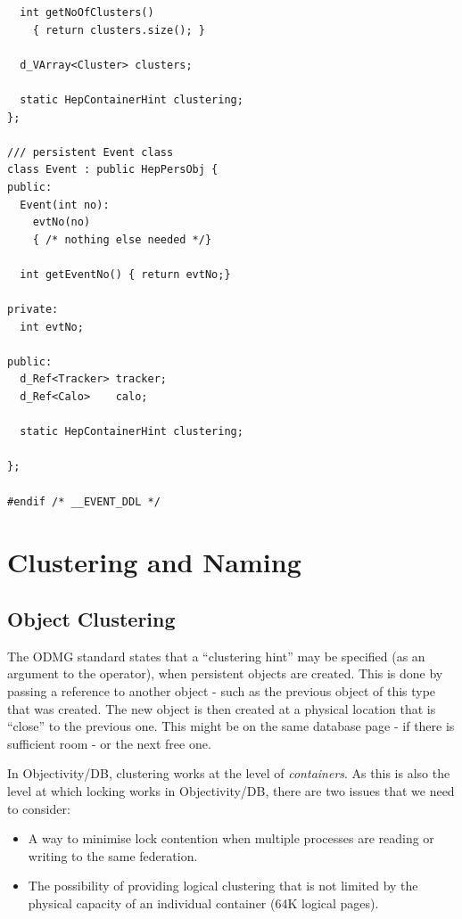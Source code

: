\begin{verbatim}
  int getNoOfClusters() 
    { return clusters.size(); } 

  d_VArray<Cluster> clusters; 

  static HepContainerHint clustering; 
}; 

/// persistent Event class 
class Event : public HepPersObj { 
public: 
  Event(int no): 
    evtNo(no) 
    { /* nothing else needed */} 

  int getEventNo() { return evtNo;} 

private: 
  int evtNo; 

public: 
  d_Ref<Tracker> tracker; 
  d_Ref<Calo>    calo; 

  static HepContainerHint clustering; 
  
}; 

#endif /* __EVENT_DDL */ 

\end{verbatim}
\chapter{Clustering and Naming\label{H1ClusteringNaming}}
\section{Object Clustering}

\par

The ODMG standard states that a ``clustering hint'' may be specified
(as an argument to the  operator), when persistent objects
are created. This is done by passing a reference to another object - 
such as the previous object of this type that was created. The new
object is then created at a physical location that is ``close''
to the previous one. This might be on the same database page - if there
is sufficient room - or the next free one.
\par

In Objectivity/DB, clustering works at the level of \emph{containers}. As this is
also the level at which locking works in Objectivity/DB, there are two issues that we need
to consider:
\begin{itemize}

\item A way to minimise lock contention when multiple processes are
reading or writing to the same federation.
\item The possibility of providing logical clustering that is not limited
by the physical capacity of an individual container (64K logical pages).\end{itemize}

